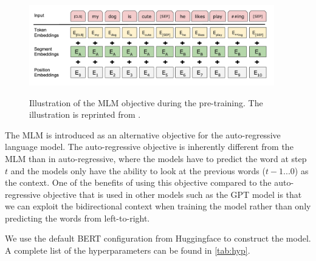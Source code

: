 \begin{figure}[h]
    {\includegraphics[width=0.95\textwidth]{img/mlm_obj.png}}
    \centering
    \caption{Illustration of the MLM objective during the pre-training. The illustration is reprinted from \cite{devlin2018bert}.}
    \label{img:mlmobj}
\end{figure}

The MLM is introduced as an alternative objective for the auto-regressive language model. The auto-regressive objective is inherently different from the MLM than in auto-regressive, where the models have to predict the word at step $t$ and the models only have the ability to look at the previous words ($t-1...0$) as the context.
One of the benefits of using this objective compared to the auto-regressive objective that is used in other models such as the GPT model  is that we can exploit the bidirectional context when training the model rather than only predicting the words from left-to-right.

We use the default BERT configuration from Huggingface to construct the model. A complete list of the hyperparameters can be found in \cref{tab:hyp}.

